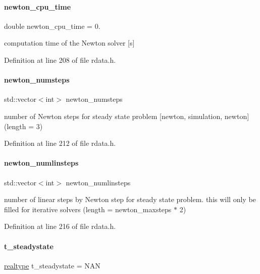 \paragraph{\texorpdfstring{newton\_cpu\_time}{newton\_cpu\_time}}
{\footnotesize\ttfamily double newton\+\_\+cpu\+\_\+time = 0.}

computation time of the Newton solver \mbox{[}s\mbox{]} 

Definition at line 208 of file rdata.\+h.

\mbox{\label{classamici_1_1_return_data_ae8d9136bb7510303556f9935a15b9318}} 
\paragraph{\texorpdfstring{newton\_numsteps}{newton\_numsteps}}
{\footnotesize\ttfamily std\+::vector$<$int$>$ newton\+\_\+numsteps}

number of Newton steps for steady state problem \mbox{[}newton, simulation, newton\mbox{]} (length = 3) 

Definition at line 212 of file rdata.\+h.

\mbox{\label{classamici_1_1_return_data_a08ca5d9be9ff8f50955327334e5e87bb}} 
\paragraph{\texorpdfstring{newton\_numlinsteps}{newton\_numlinsteps}}
{\footnotesize\ttfamily std\+::vector$<$int$>$ newton\+\_\+numlinsteps}

number of linear steps by Newton step for steady state problem. this will only be filled for iterative solvers (length = newton\+\_\+maxsteps $\ast$ 2) 

Definition at line 216 of file rdata.\+h.

\mbox{\label{classamici_1_1_return_data_ae6c276c43addc2845ce72e7188924cc4}} 
\paragraph{\texorpdfstring{t\_steadystate}{t\_steadystate}}
{\footnotesize\ttfamily \mbox{\hyperlink{namespaceamici_a1bdce28051d6a53868f7ccbf5f2c14a3}{realtype}} t\+\_\+steadystate = N\+AN}

